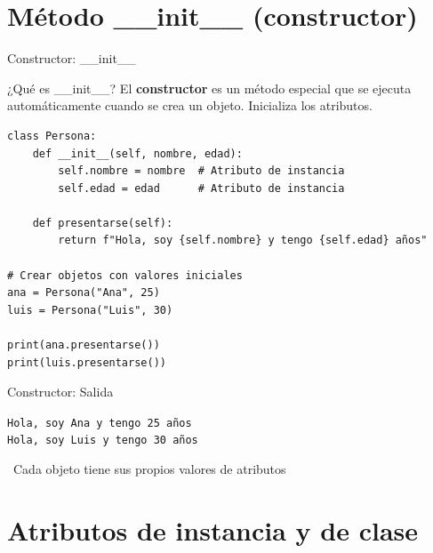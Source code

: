 \documentclass{beamer}
\begin{document}
\section{Método \_\_init\_\_ (constructor)}

\begin{frame}[fragile]{Constructor: \_\_init\_\_ \faWrench}
\begin{conceptbox}{¿Qué es \_\_init\_\_?}
El \textbf{constructor} es un método especial que se ejecuta automáticamente cuando se crea un objeto. Inicializa los atributos.
\end{conceptbox}

\begin{lstlisting}
class Persona:
    def __init__(self, nombre, edad):
        self.nombre = nombre  # Atributo de instancia
        self.edad = edad      # Atributo de instancia
    
    def presentarse(self):
        return f"Hola, soy {self.nombre} y tengo {self.edad} años"

# Crear objetos con valores iniciales
ana = Persona("Ana", 25)
luis = Persona("Luis", 30)

print(ana.presentarse())
print(luis.presentarse())
\end{lstlisting}
\end{frame}

\begin{frame}[fragile]{Constructor: Salida \faArrowCircleRight}
\begin{tcolorbox}[colback=green!10,colframe=green,title={\small\faArrowCircleRight \ Salida},coltitle=fg0,left=3pt,right=3pt,top=3pt,bottom=3pt,boxsep=2pt]
\small\texttt{Hola, soy Ana y tengo 25 años\\
Hola, soy Luis y tengo 30 años}
\end{tcolorbox}

\vspace{0.3cm}
\begin{notebox}
\small\faLightbulb\ Cada objeto tiene sus propios valores de atributos
\end{notebox}
\end{frame}

\section{Atributos de instancia y de clase}
\end{document}
